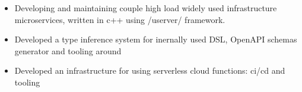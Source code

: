 \documentclass[10pt,a4paper,ragged2e,withhyper]{altacv}
\begin{document}


\begin{paracol}{2}

\tagline{}


\makecvheader

\medskip


\begin{itemize}
  \item Developing and maintaining couple high load widely used infrastructure microservices, written in c++ using /userver/ framework.
  \item Developed a type inference system for inernally used DSL, OpenAPI schemas generator and tooling around
  \item Developed an infrastructure for using serverless cloud functions: ci/cd and tooling
\end{itemize}



\end{paracol}
\end{document}

